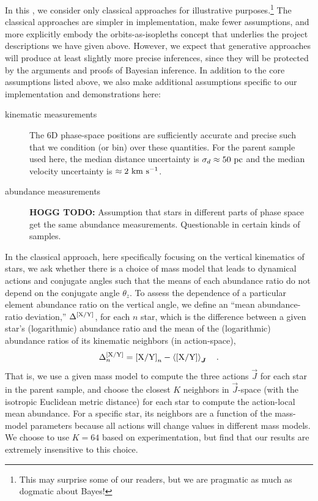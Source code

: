 \documentclass[modern]{aastex63}
\newcommand{\HOGGTODO}[1]{{\color{tabred}\textbf{HOGG TODO:} #1}}
\begin{document}
In this \documentname, we consider only classical approaches for illustrative
purposes.\footnote{This may surprise some of our readers, but we are pragmatic
as much as dogmatic about Bayes!}
The classical approaches are simpler in implementation, make fewer assumptions,
and more explicitly embody the orbits-as-isopleths concept that underlies the
project descriptions we have given above.
However, we expect that generative approaches will produce at least slightly
more precise inferences, since they will be protected by the arguments and
proofs of Bayesian inference.
In addition to the core assumptions listed above, we also make additional
assumptions specific to our implementation and demonstrations here:
\begin{description}
\item[kinematic measurements] The 6D phase-space positions are sufficiently
  accurate and precise such that we condition (or bin) over these quantities.
  For the parent sample used here, the median distance uncertainty is $\sigma_d
  \approx 50~\mathrm{pc}$ and the median velocity uncertainty is $\approx 2~\mathrm{km}~\mathrm{s}^{-1}$.

\item[abundance measurements] \HOGGTODO{Assumption that stars in different parts
  of phase space get the same abundance measurements.} Questionable in certain
  kinds of samples.
\end{description}

In the classical approach, here specifically focusing on the vertical kinematics
of stars, we ask whether there is a choice of mass model that leads to dynamical
actions and conjugate angles such that the means of each abundance ratio do not
depend on the conjugate angle $\theta_z$.
To assess the dependence of a particular element abundance ratio
 on the vertical angle, we define an ``mean abundance-ratio
deviation,'' $\Delta^{{[\mathrm{X}/\mathrm{Y}]}}$, for each $n$ star, which is the
difference between a given star's (logarithmic) abundance ratio and the mean of
the (logarithmic) abundance ratios of its kinematic neighbors (in action-space),
\begin{equation}
  \Delta^{\abunratio{X}{Y}}_n = \abunratio{X}{Y}_n -
    \left\langle \abunratio{X}{Y} \right\rangle_{\vec{J}}
    \quad .
\end{equation}
That is, we use a given mass model to compute the three actions $\vec{J}$ for
each star in the parent sample, and choose the closest $K$ neighbors in
$\vec{J}$-space (with the isotropic Euclidean metric distance) for each star to
compute the action-local mean abundance.
For a specific star, its neighbors are a function of the mass-model parameters
because all actions will change values in different mass models.
We choose to use $K=64$ based on experimentation, but find that our results are
extremely insensitive to this choice.
\end{document}
